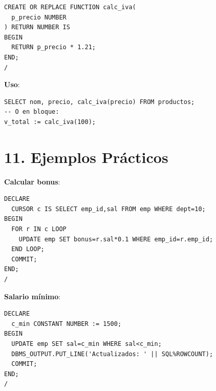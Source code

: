 \documentclass[8pt,a4paper,twocolumn]{article}
\begin{document}
\begin{lstlisting}
CREATE OR REPLACE FUNCTION calc_iva(
  p_precio NUMBER
) RETURN NUMBER IS
BEGIN
  RETURN p_precio * 1.21;
END;
/
\end{lstlisting}

\textbf{Uso}:
\begin{lstlisting}
SELECT nom, precio, calc_iva(precio) FROM productos;
-- O en bloque:
v_total := calc_iva(100);
\end{lstlisting}

\section*{11. Ejemplos Prácticos}

\textbf{Calcular bonus}:
\begin{lstlisting}
DECLARE
  CURSOR c IS SELECT emp_id,sal FROM emp WHERE dept=10;
BEGIN
  FOR r IN c LOOP
    UPDATE emp SET bonus=r.sal*0.1 WHERE emp_id=r.emp_id;
  END LOOP;
  COMMIT;
END;
/
\end{lstlisting}

\textbf{Salario mínimo}:
\begin{lstlisting}
DECLARE
  c_min CONSTANT NUMBER := 1500;
BEGIN
  UPDATE emp SET sal=c_min WHERE sal<c_min;
  DBMS_OUTPUT.PUT_LINE('Actualizados: ' || SQL%ROWCOUNT);
  COMMIT;
END;
/
\end{lstlisting}
\end{document}
